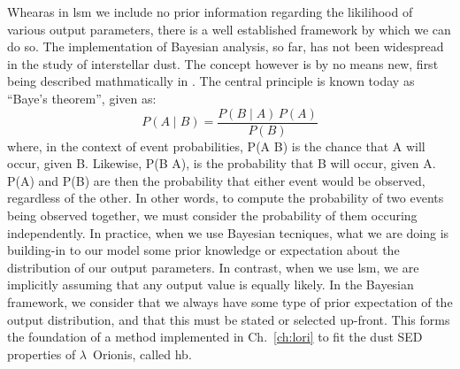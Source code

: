       Whearas in \acrshort{lsm} we include no prior information regarding the likilihood of various output parameters, there is a well established framework by which we can do so.  The implementation of Bayesian analysis, so far, has not been widespread in the study of interstellar dust. The concept however is by no means new, first being described mathmatically in \cite{bayes1763}. The central principle is known today as ``Baye's theorem'', given as:
           \begin{equation}
               P(A\mid{} B) = \frac{P(B \mid{} A) \, P(A)}{P(B)}
           \end{equation}
        where, in the context of event probabilities, P(A\mid{} B) is the chance that A will occur, given B. Likewise, P(B\mid{} A), is the probability that B will occur, given A. P(A) and P(B) are then the probability that either event would be observed, regardless of the other. In other words, to compute the probability of two events being observed together, we must consider the probability of them occuring independently. In practice, when we use Bayesian tecniques, what we are doing is building-in to our model some prior knowledge or expectation about the distribution of our output parameters. In contrast, when we use \acrshort{lsm}, we are implicitly assuming that any output value is equally likely. In the Bayesian framework, we consider that we always have some type of prior expectation of the output distribution, and that this must be stated or selected up-front. This forms the foundation of a method implemented in Ch.~\ref{ch:lori} to fit the dust SED properties of $\lambda$~Orionis, called \acrlong{hb}.


